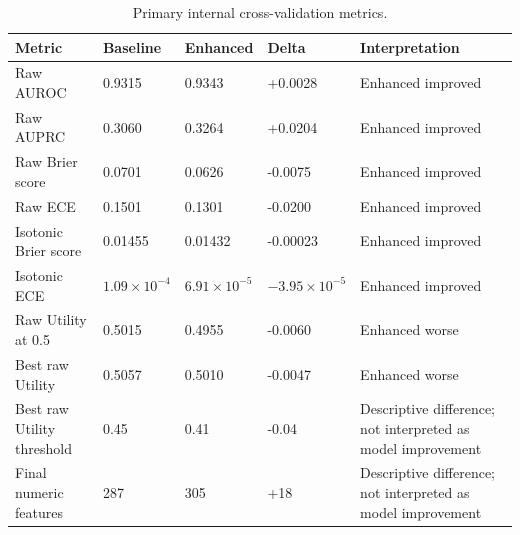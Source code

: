 \begin{table}[!t]
\centering
\caption{Primary internal cross-validation metrics.}
\label{tab:phase8_primary_metrics}
\footnotesize
\renewcommand{\arraystretch}{1.12}
\begin{tabular*}{\textwidth}{@{\extracolsep{\fill}}lllll}
\toprule
\textbf{Metric} & \textbf{Baseline} & \textbf{Enhanced} & \textbf{Delta} & \textbf{Interpretation} \\
\midrule
Raw AUROC & 0.9315 & 0.9343 & +0.0028 & Enhanced improved \\
Raw AUPRC & 0.3060 & 0.3264 & +0.0204 & Enhanced improved \\
Raw Brier score & 0.0701 & 0.0626 & -0.0075 & Enhanced improved \\
Raw ECE & 0.1501 & 0.1301 & -0.0200 & Enhanced improved \\
Isotonic Brier score & 0.01455 & 0.01432 & -0.00023 & Enhanced improved \\
Isotonic ECE & $1.09\times10^{-4}$ & $6.91\times10^{-5}$ & $-3.95\times10^{-5}$ & Enhanced improved \\
Raw Utility at 0.5 & 0.5015 & 0.4955 & -0.0060 & Enhanced worse \\
Best raw Utility & 0.5057 & 0.5010 & -0.0047 & Enhanced worse \\
Best raw Utility threshold & 0.45 & 0.41 & -0.04 & Descriptive difference; not interpreted as model improvement \\
Final numeric features & 287 & 305 & +18 & Descriptive difference; not interpreted as model improvement \\
\bottomrule
\end{tabular*}
\end{table}
